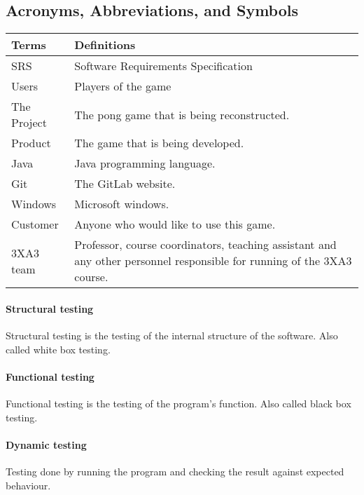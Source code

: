 \documentclass[12pt,letterpaper]{article}
\begin{document}
	\subsection{Acronyms, Abbreviations, and Symbols}
\begin{tabular}{|p{3cm}|p{8cm}|}
\hline
\textbf{Terms}    & \textbf{Definitions}                                                                                                                                                                                                                                                                                                                                                                                                                                \\\hline
SRS & Software Requirements Specification
\\\hline
Users &                                                                                                                                                                                            Players of the game \\\hline
The Project  & The pong game that is being reconstructed. \\\hline
Product       & The game that is being developed.
 \\\hline
Java            & Java programming language.
 \\\hline
Git        & The GitLab website.
 \\\hline
Windows       & Microsoft windows.
 \\\hline
Customer         & Anyone who would like to use this game.
 \\\hline
3XA3 team        & Professor, course coordinators, teaching assistant and any other personnel responsible for running of the 3XA3 course.
 \\\hline
\end{tabular}
	\paragraph{Structural testing}	Structural testing is the testing of the internal structure of the software. Also called white box testing.
	\paragraph{Functional testing}	Functional testing is the testing of the program’s function. Also called black box testing.
	\paragraph{Dynamic testing}	Testing done by running the program and checking the result against expected behaviour.
\end{document}
